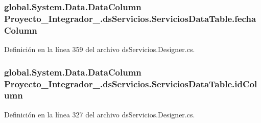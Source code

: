 \hypertarget{class_proyecto___integrador__3_1_1ds_servicios_1_1_servicios_data_table_afc3e8d1e9b39b8a278418310fadc37e1}{
\subsubsection[{fecha\-Column}]{\setlength{\rightskip}{0pt plus 5cm}global.\-System.\-Data.\-Data\-Column Proyecto\-\_\-\-Integrador\-\_.\-ds\-Servicios.\-Servicios\-Data\-Table.\-fecha\-Column\hspace{0.3cm}{\ttfamily [get]}}}\label{class_proyecto___integrador__3_1_1ds_servicios_1_1_servicios_data_table_afc3e8d1e9b39b8a278418310fadc37e1}


Definición en la línea 359 del archivo ds\-Servicios.\-Designer.\-cs.

\hypertarget{class_proyecto___integrador__3_1_1ds_servicios_1_1_servicios_data_table_a238b98b486c4eb6077f5eb1d26596f26}{
\subsubsection[{id\-Column}]{\setlength{\rightskip}{0pt plus 5cm}global.\-System.\-Data.\-Data\-Column Proyecto\-\_\-\-Integrador\-\_.\-ds\-Servicios.\-Servicios\-Data\-Table.\-id\-Column\hspace{0.3cm}{\ttfamily [get]}}}\label{class_proyecto___integrador__3_1_1ds_servicios_1_1_servicios_data_table_a238b98b486c4eb6077f5eb1d26596f26}


Definición en la línea 327 del archivo ds\-Servicios.\-Designer.\-cs.

